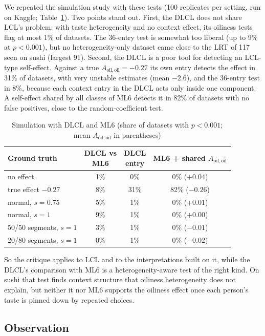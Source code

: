 \documentclass[11pt,journal,a4paper]{IEEEtran}
\newcommand{\Aoo}{A_{\mathrm{oil,oil}}}
\begin{document}
We repeated the simulation study with these tests (100 replicates per setting, run on Kaggle;
Table~\ref{tab:dlclsim}). Two points stand out. First, the DLCL does not share LCL's problem: with taste
heterogeneity and no context effect, its oiliness tests flag at most 1\% of datasets. The 36-entry test is somewhat
too liberal (up to 9\% at $p<0.001$), but no heterogeneity-only dataset came close to the LRT of 117 seen on sushi
(largest 91). Second, the DLCL is a poor tool for detecting an LCL-type self-effect. Against a true $\Aoo=-0.27$
its own entry detects the effect in 31\% of datasets, with very unstable estimates (mean $-2.6$), and the
36-entry test in 8\%, because each context entry in the DLCL acts only inside one component. A self-effect
shared by all classes of ML6 detects it in 82\% of datasets with no false positives, close to the
random-coefficient test.

\begin{table}[!t]
\caption{Simulation with DLCL and ML6 (share of datasets with $p<0.001$; mean $\Aoo$ in parentheses)}
\label{tab:dlclsim}
\centering\footnotesize
\setlength{\tabcolsep}{3pt}
\begin{tabular}{lccc}
\toprule
Ground truth & \shortstack{DLCL vs\\ML6} & \shortstack{DLCL\\entry} & \shortstack{ML6 + shared\\$\Aoo$} \\
\midrule
no effect & 1\% & 0\% & 0\% ($+0.04$) \\
true effect $-0.27$ & 8\% & 31\% & 82\% ($-0.26$) \\
normal, $s=0.75$ & 5\% & 1\% & 0\% ($+0.01$) \\
normal, $s=1$ & 9\% & 1\% & 0\% ($+0.00$) \\
50/50 segments, $s=1$ & 3\% & 1\% & 0\% ($-0.01$) \\
20/80 segments, $s=1$ & 0\% & 1\% & 0\% ($-0.02$) \\
\bottomrule
\end{tabular}
\end{table}

So the critique applies to LCL and to the interpretations built on it, while the DLCL's comparison with ML6
is a heterogeneity-aware test of the right kind. On sushi that test finds context structure that oiliness
heterogeneity does not explain, but neither it nor ML6 supports the oiliness effect once each person's taste is
pinned down by repeated choices.

\subsection{Observation}
\end{document}
